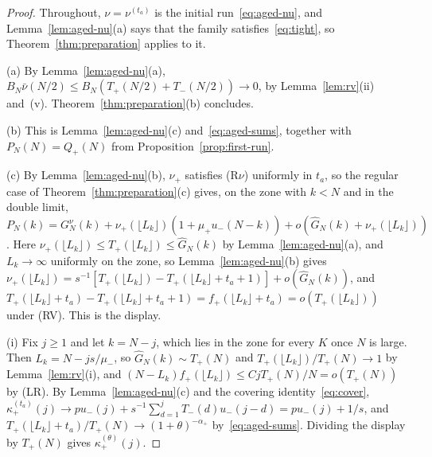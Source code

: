 \begin{proof}
Throughout, $\nu=\nu^{(t_a)}$ is the initial run~\eqref{eq:aged-nu}, and Lemma~\ref{lem:aged-nu}(a)
says that the family satisfies~\eqref{eq:tight}, so Theorem~\ref{thm:preparation} applies to it.

(a) By Lemma~\ref{lem:aged-nu}(a), $B_N\bar\nu(N/2)\le B_N(T_\plus(N/2)+T_\minus(N/2))\to0$, by
Lemma~\ref{lem:rv}(ii) and~(v). Theorem~\ref{thm:preparation}(b) concludes.

(b) This is Lemma~\ref{lem:aged-nu}(c) and~\eqref{eq:aged-sums}, together with
$P_N(N)=Q_\plus(N)$ from Proposition~\ref{prop:first-run}.

(c) By Lemma~\ref{lem:aged-nu}(b), $\nu_\plus$ satisfies (R$\nu$) uniformly in $t_a$, so the
regular case of Theorem~\ref{thm:preparation}(c) gives, on the zone with $k<N$ and in the
double limit,
$P_N(k)=G^\nu_N(k)+\nu_\plus(\lfloor L_k\rfloor)(1+\mu_\plus u_\minus(N-k))+o(\widehat G_N(k)+\nu_\plus(\lfloor L_k\rfloor))$.
Here $\nu_\plus(\lfloor L_k\rfloor)\le T_\plus(\lfloor L_k\rfloor)\le\widehat G_N(k)$ by
Lemma~\ref{lem:aged-nu}(a), and $L_k\to\infty$ uniformly on the zone, so
Lemma~\ref{lem:aged-nu}(b) gives
$\nu_\plus(\lfloor L_k\rfloor)=s^{-1}[T_\plus(\lfloor L_k\rfloor)-T_\plus(\lfloor L_k\rfloor+t_a+1)]+o(\widehat G_N(k))$,
and $T_\plus(\lfloor L_k\rfloor+t_a)-T_\plus(\lfloor L_k\rfloor+t_a+1)=f_\plus(\lfloor L_k\rfloor+t_a)=o(T_\plus(\lfloor L_k\rfloor))$
under (RV). This is the display.

(i) Fix $j\ge1$ and let $k=N-j$, which lies in the zone for every $K$ once $N$ is large.
Then $L_k=N-js/\mu_\minus$, so $\widehat G_N(k)\sim T_\plus(N)$ and
$T_\plus(\lfloor L_k\rfloor)/T_\plus(N)\to1$ by Lemma~\ref{lem:rv}(i), and
$(N-L_k)f_\plus(\lfloor L_k\rfloor)\le CjT_\plus(N)/N=o(T_\plus(N))$ by (LR). By
Lemma~\ref{lem:aged-nu}(c) and the covering identity~\eqref{eq:cover},
$\kappa^{(t_a)}_\plus(j)\to pu_\minus(j)+s^{-1}\sum_{d=1}^{j}T_\minus(d)u_\minus(j-d)=pu_\minus(j)+1/s$,
and $T_\plus(\lfloor L_k\rfloor+t_a)/T_\plus(N)\to(1+\theta)^{-\alpha_\plus}$ by~\eqref{eq:aged-sums}.
Dividing the display by $T_\plus(N)$ gives $\kappa^{(\theta)}_\plus(j)$.


\end{proof}
